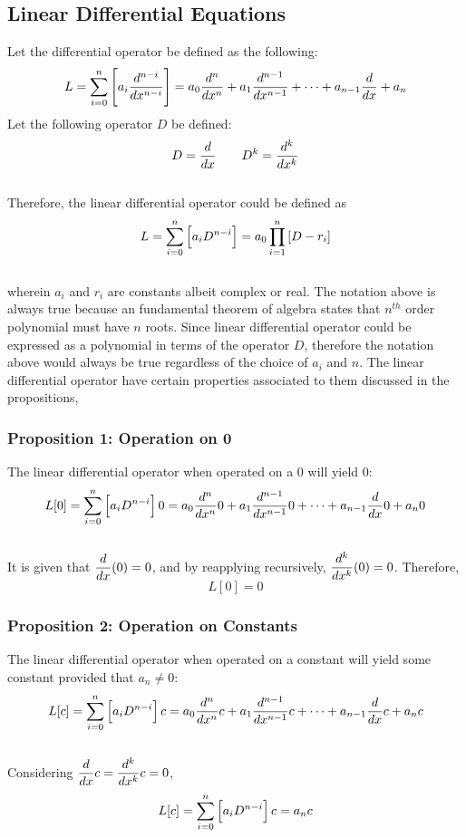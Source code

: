 \documentclass[class=report, 12pt, crop=false]{standalone}
\begin{document}
\begin{center}


\chapter{Linear Differential Equations}
\begin{comment}
\end{comment}
\begin{comment}
\end{comment}
Let the differential operator be defined as the following: 
$$L = \sum_{i = 0}^{n}\left[a_i \frac{d^{n - i}}{dx^{n - i}}\right] = a_0 \frac{d^{n }}{dx^{n}} + a_1 \frac{d^{n - 1}}{dx^{n - 1}}+ \dots + a_{n - 1}\frac{d}{dx} + a_n$$
Let the following operator $D$ be defined:
$$D = \frac{d}{dx} \qquad D^k = \frac{d^k}{dx^k}$$
\\Therefore, the linear differential operator could be defined as 
$$L = \sum_{i = 0}^{n}\left[a_i D^{n - i}\right] = a_0\prod_{i = 1}^{n}\left[D - r_i\right]$$
\\wherein $a_i$ and $r_i$ are constants albeit complex or real. The notation above is always true because an fundamental theorem of algebra states that $n^{th}$ order polynomial must have $n$ roots. Since linear differential operator could be expressed as a polynomial in terms of the operator $D$, therefore the notation above would always be true regardless of the choice of $a_i$ and $n$. The linear differential operator have certain properties associated to them discussed in the propositions,
\subsection{Proposition 1: Operation on 0} 
\begin{comment}
\end{comment}
The linear differential operator when operated on a 0 will yield 0:
$$L[0]=\sum_{i = 0}^{n}\left[a_i D^{n - i}\right]0=a_0 \frac{d^{n }}{dx^{n}}0 + a_1 \frac{d^{n - 1}}{dx^{n - 1}}0+ \dots + a_{n - 1}\frac{d}{dx}0 + a_n0$$ 
\\It is given that $\displaystyle{\frac{d}{dx}(0) = 0}$, and by reapplying recursively, $\displaystyle{\frac{d^k}{dx^k}(0) = 0}$. Therefore, 
$$L[0]=0$$
\subsection{Proposition 2: Operation on Constants}
\begin{comment}
\end{comment}
The linear differential operator when operated on a constant will yield some constant provided that $a_n \neq 0$:
$$L[c] = \sum_{i = 0}^{n}\left[a_i D^{n - i}\right]c = a_0 \frac{d^{n }}{dx^{n}}c + a_1 \frac{d^{n - 1}}{dx^{n - 1}}c+ \dots + a_{n - 1}\frac{d}{dx}c + a_nc$$
\\Considering $\displaystyle{\frac{d}{dx}c = \frac{d^k}{dx^k}c = 0}$,
$$L[c] = \sum_{i = 0}^{n}\left[a_i D^{n - i}\right]c = a_nc$$

\end{center}
\end{document}
